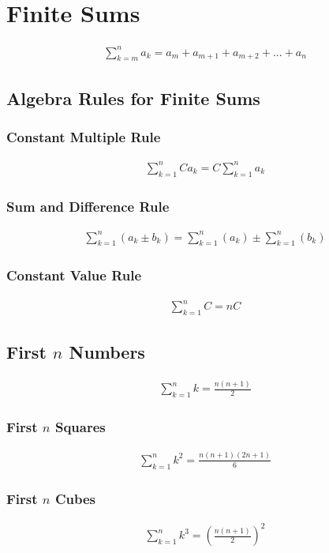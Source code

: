 \documentclass{article}
\newcommand\regsum{\sum_{k=1}^{n}}
\begin{document}
\section{Finite Sums}
    \begin{gather*}
        \sum_{k=m}^{n} a_{k} = a_{m} + a_{m+1} + a_{m+2} + ... + a_n
    \end{gather*}
    \subsection{Algebra Rules for Finite Sums}
        \subsubsection{Constant Multiple Rule}
            \begin{gather*}
                \regsum Ca_k = C \regsum a_k
            \end{gather*}
        \subsubsection{Sum and Difference Rule}
            \begin{gather*}
                \regsum (a_k\pm b_k) = \regsum(a_k) \pm \regsum(b_k)
            \end{gather*}
        \subsubsection{Constant Value Rule}
            \begin{gather*}
                \regsum C = nC
            \end{gather*}
    \subsection{First \(n\) Numbers}
        \begin{gather*}
            \regsum k = \frac{n(n+1)}{2}
        \end{gather*}
        \subsubsection{First \(n\) Squares}
            \begin{gather*}
                \regsum k^2 = \frac{n(n+1)(2n+1)}{6}
            \end{gather*}
        \subsubsection{First \(n\) Cubes}
            \begin{gather*}
                \regsum k^3 = \left(\frac{n(n+1)}{2}\right)^2
            \end{gather*}
\end{document}
